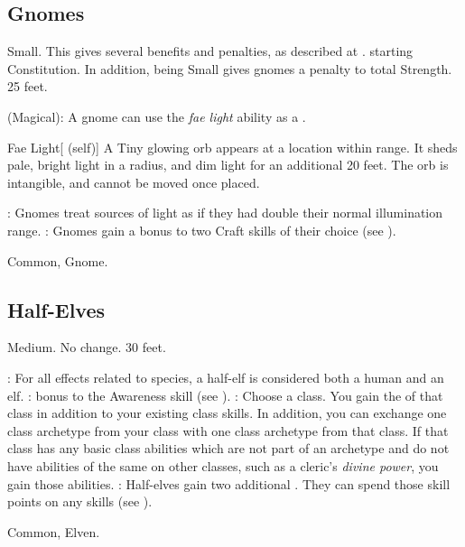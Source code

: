 \subsection{Gnomes}
 Small. This gives several benefits and penalties, as described at .
  starting Constitution. In addition, being Small gives gnomes a  penalty to total Strength.
 25 feet.
\begin{itemize}
     (Magical): A gnome can use the \textit{fae light} ability as a .
        \begin{attuneability}{Fae Light}[ (self)]
            A Tiny glowing orb appears at a location within \rngmed range.
            It sheds pale, bright light in a \areamed radius, and dim light for an additional 20 feet.
            The orb is intangible, and cannot be moved once placed.
        \end{attuneability}
    : Gnomes treat sources of light as if they had double their normal illumination range.
    : Gnomes gain a  bonus to two Craft skills of their choice (see ).
\end{itemize}
 Common, Gnome.

\subsection{Half-Elves}\label{Half-Elves}
 Medium.
 No change.
 30 feet.
\begin{itemize}
    : For all effects related to species, a half-elf is considered both a human and an elf.
    :  bonus to the Awareness skill (see ).
    : Choose a class.
        You gain the  of that class in addition to your existing class skills.
        In addition, you can exchange one class archetype from your class with one class archetype from that class.
        If that class has any basic class abilities which are not part of an archetype and do not have abilities of the same on other classes, such as a cleric's \textit{divine power}, you gain those abilities.
    : Half-elves gain two additional . They can spend those skill points on any skills (see ).
\end{itemize}
 Common, Elven.

